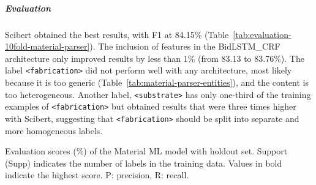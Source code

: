\subparagraph*{Evaluation}

Scibert obtained the best results, with F1 at 84.15\% (Table~\ref{tab:evaluation-10fold-material-parser}).
The inclusion of features in the BidLSTM\_CRF architecture only improved results by less than 1\% (from 83.13 to 83.76\%).
The label \texttt{<fabrication>} did not perform well with any architecture, most likely because it is too generic (Table~\ref{tab:material-parser-entities}), and the content is too heterogeneous. Another label, \texttt{<substrate>} has only one-third of the training examples of \texttt{<fabrication>} but obtained results that were three times higher with Scibert, suggesting that \texttt{<fabrication>} should be split into separate and more homogeneous labels.

\begin{table}[ht]
    \centering\small
    \caption{Evaluation scores (\%) of the Material ML model with holdout set. Support (Supp) indicates the number of labels in the training data. Values in bold indicate the highest score. P: precision, R: recall.}
    

\end{table}
